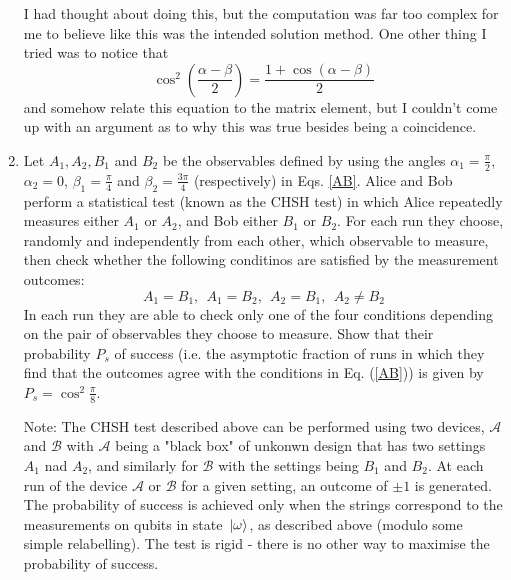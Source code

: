 \documentclass[10pt]{article}
\begin{document}
\begin{enumerate}[label=\alph*)]
\begin{solution}
				I had thought about doing this, but the computation was far too complex for me to believe like this 
				was the intended solution method. One other thing I tried was to notice that
				\[
				\cos^2\left( \frac{\alpha - \beta}{2} \right)  = \frac{1 + \cos(\alpha - \beta)}{2}
				\] 
				and somehow relate this equation to the matrix element, but I couldn't come up with an argument 
				as to why this was true besides being a coincidence. 
			\end{solution}
		\item Let \( A_1, A_2, B_1 \) and \( B_2 \) be the observables defined by using the angles \( \alpha_1 = 
			\frac{\pi}{2}\), \( \alpha_2 = 0\), \( \beta_1 = \frac{\pi}{4} \) and \( \beta_2 = \frac{3\pi}{4} \) 
			(respectively) in Eqs. \ref{AB}. Alice and Bob perform a statistical test (known as the CHSH test)
			in which Alice repeatedly measures either \( A_1  \) or \( A_2 \), and Bob either 
			\( B_1 \) or \( B_2 \). For each run they choose, randomly and independently from each other, which 
			observable to measure, then check whether the following conditinos are satisfied by 
			the measurement outcomes:
			\begin{equation}\label{cond}
			A_1 = B_1, \ \ A_1 = B_2, \ \ A_2 = B_1, \ \ A_2 \neq B_2
			\end{equation} 
			In each run they are able to check only one of the four conditions depending on the pair of observables 
			they choose to measure. 
			Show that their probability \( P_s \) of success (i.e. the asymptotic fraction of runs in which they find 
			that the outcomes agree with the conditions in Eq. (\ref{AB})) is given by \( P_s = \cos^2 \frac{\pi}{8} \).

			Note: The CHSH test described above can be performed using two devices, \( \mathcal A \) and 
			\( \mathcal B \) with \( \mathcal A \) being a "black box" of unkonwn design that has two settings 
			\( A_1 \) nad \( A_2 \), and similarly for \( \mathcal B \) with the settings being \( B_1 \) and \( B_2 \).
			At each run of the device \( \mathcal A \) or \( \mathcal B \) for a given setting, an outcome 
			of \( \pm 1 \) is generated. The probability of success is achieved only when the strings correspond 
			to the measurements on qubits in state \( \ket*{\omega} \), as described above (modulo some simple 
			relabelling). The test is rigid - there is no other way to maximise the probability of success. 


\end{enumerate}
\end{document}
